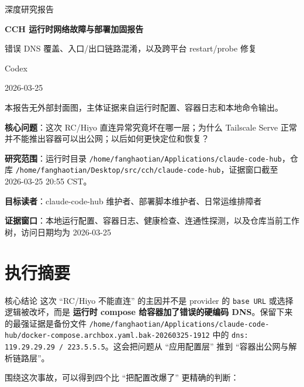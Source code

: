\documentclass[a4paper]{article}
\newcommand{\filepath}[1]{\nolinkurl{#1}}
\newcommand{\reporttitle}{CCH 运行时网络故障与部署加固报告}
\newcommand{\reportsubtitle}{错误 DNS 覆盖、入口/出口链路混淆，以及跨平台 restart/probe 修复}
\newcommand{\reportauthors}{Codex}
\newcommand{\reportdate}{2026-03-25}
\newcommand{\researchquestion}{这次 RC/Hiyo 直连异常究竟坏在哪一层；为什么 Tailscale Serve 正常并不能推出容器可以出公网；以后如何更快定位和恢复？}
\newcommand{\reportscope}{运行时目录 \filepath{/home/fanghaotian/Applications/claude-code-hub}，仓库 \filepath{/home/fanghaotian/Desktop/src/cch/claude-code-hub}，证据窗口截至 2026-03-25 20:55 CST。}
\newcommand{\reportaudience}{claude-code-hub 维护者、部署脚本维护者、日常运维排障者}
\newcommand{\sourcewindow}{本地运行配置、容器日志、健康检查、连通性探测，以及仓库当前工作树，访问日期均为 2026-03-25}
\begin{document}
\begin{titlepage}
\centering
{\Large 深度研究报告\par}
\vspace{1.0cm}
{\huge\bfseries \reporttitle\par}
\vspace{0.5cm}
{\Large \reportsubtitle\par}
\vspace{0.9cm}
{\large \reportauthors\par}
\vspace{0.2cm}
{\large \reportdate\par}
\vspace{1.0cm}

{\small 本报告无外部封面图，主体证据来自运行时配置、容器日志和本地命令输出。\par}

\vfill
\begin{tcolorbox}[width=0.94\textwidth, colback=black!2!white, colframe=black!60, sharp corners]
\textbf{核心问题}：\researchquestion\par
\textbf{研究范围}：\reportscope\par
\textbf{目标读者}：\reportaudience\par
\textbf{证据窗口}：\sourcewindow\par
\end{tcolorbox}
\end{titlepage}

\tableofcontents
\newpage

\section{执行摘要}

\begin{findingbox}{核心结论}
这次 ``RC/Hiyo 不能直连'' 的主因并不是 provider 的 \texttt{base URL} 或选择逻辑被改坏，而是 \textbf{运行时 compose 给容器加了错误的硬编码 DNS}。保留下来的最强证据是备份文件 \filepath{/home/fanghaotian/Applications/claude-code-hub/docker-compose.archbox.yaml.bak-20260325-1912} 中的 \texttt{dns: 119.29.29.29 / 223.5.5.5}。这会把问题从 ``应用配置层'' 推到 ``容器出公网与解析链路层''。
\end{findingbox}

围绕这次事故，可以得到四个比 ``把配置改爆了'' 更精确的判断：
\end{document}
